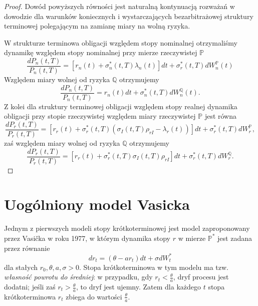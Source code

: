 \documentclass{mini}
\theoremstyle{mythstyle}
\begin{document}
\begin{proof}
	 Dowód powyższych równości jest naturalną kontynuacją rozważań w dowodzie dla warunków koniecznych i wystarczających bezarbitrażowej struktury terminowej polegającym na zamianę miary na wolną ryzyka.
	 
	 W strukturze terminowa obligacji względem stopy nominalnej otrzymaliśmy dynamikę względem stopy nominalnej przy mierze rzeczywistej $\mathbb{P}$
	 \begin{equation}
	 \frac{dP_n(t,T)}{P_n(t,T)} = [r_n(t) +\sigma^*_n(t,T)\lambda_n(t)]dt + \sigma^*_r(t,T)dW^\mathbb{P}_n(t)
	 \end{equation}
	 Względem miary wolnej od ryzyka $\mathbb{Q}$ otrzymujemy
	 \begin{equation}
	 \frac{dP_n(t,T)}{P_n(t,T)} = r_n(t)dt + \sigma^*_n(t,T)dW^\mathbb{Q}_n(t).
	 \end{equation}
	 Z kolei dla struktury terminowej obligacji względem stopy realnej dynamika obligacji przy stopie rzeczywistej względem miary rzeczywistej $\mathbb{P}$ jest równa
	 \begin{equation}
	 \frac{dP_r(t,T)}{P_r(t,T)} = [r_r(t) +\sigma^*_r(t,T)(\sigma_I(t,T)\rho_{rI}-\lambda_r(t))]dt + \sigma^*_r(t,T)dW^\mathbb{P}_r,
	 \end{equation}
	 zaś względem miary wolnej od ryzyka $\mathbb{Q}$ otrzymujemy
	 \begin{equation}
	 \frac{dP_r(t,T)}{P_r(t,T)} = [r_r(t) +\sigma^*_r(t,T)\sigma_I(t,T)\rho_{rI}]dt + \sigma^*_r(t,T)dW^\mathbb{Q}_r.
	 \end{equation}
	 
	 
\end{proof}
	
	\section{Uogólniony model Vasicka}
	Jednym z pierwszych modeli stopy krótkoterminowej jest model zaproponowany przez Vasi\v{c}ka w roku 1977, w którym dynamika stopy $r$ w mierze $\mathbb{P}^*$ jest zadana przez równanie
	\begin{equation}
	 dr_t =(\theta -ar_t)dt+\sigma dW_t^*
	\end{equation}
	dla stałych $r_0,\theta,a,\sigma >0$. Stopa krótkoterminowa w tym modelu ma tzw. \textit{własność powrotu do średniej}: w przypadku, gdy $r_t < \frac{\theta}{a}$, dryf procesu jest dodatni; jeśli zaś $r_t > \frac{\theta}{a}$, to dryf jest ujemny. Zatem dla każdego $t$ stopa krótkoterminowa $r_t$ zbiega do wartości $\frac{\theta}{a}$. 
	
\end{document}

